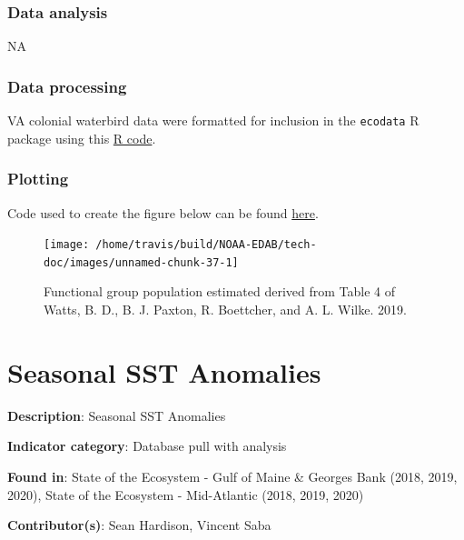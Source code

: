\documentclass[
]{book}
\begin{document}
\hypertarget{data-analysis-32}{%
\subsection{Data analysis}\label{data-analysis-32}}

NA

\hypertarget{data-processing-24}{%
\subsection{Data processing}\label{data-processing-24}}

VA colonial waterbird data were formatted for inclusion in the \texttt{ecodata} R package using this \href{https://github.com/NOAA-EDAB/ecodata/blob/master/data-raw/get_seabird_MAB.R}{R code}.

\hypertarget{plotting-26}{%
\subsection{Plotting}\label{plotting-26}}

Code used to create the figure below can be found \href{https://github.com/NOAA-EDAB/ecodata/blob/master/chunk-scripts/macrofauna.Rmd-VA-cote.R}{here}.

\begin{figure}

{\centering \texttt{[image: /home/travis/build/NOAA-EDAB/tech-doc/images/unnamed-chunk-37-1]} 

}

\caption{Functional group population estimated derived from Table 4 of Watts, B. D., B. J. Paxton, R. Boettcher, and A. L. Wilke. 2019.}\label{fig:unnamed-chunk-37}
\end{figure}

\hypertarget{seasonal-sst-anomalies}{%
\chapter{Seasonal SST Anomalies}\label{seasonal-sst-anomalies}}

\textbf{Description}: Seasonal SST Anomalies

\textbf{Indicator category}: Database pull with analysis

\textbf{Found in}: State of the Ecosystem - Gulf of Maine \& Georges Bank (2018, 2019, 2020), State of the Ecosystem - Mid-Atlantic (2018, 2019, 2020)

\textbf{Contributor(s)}: Sean Hardison, Vincent Saba
\end{document}

